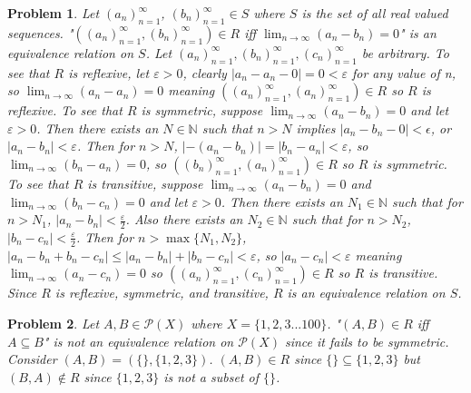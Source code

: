\documentclass{article}
\newtheorem{Problem}{Problem}
\begin{document}
\begin{Problem}
 Let $(a_n)_{n=1}^\infty$, $(b_n)_{n=1}^\infty\in S$ where $S$ is the set of all real valued sequences.  "$((a_n)_{n=1}^\infty,(b_n)_{n=1}^\infty) \in R$ iff $\lim_{n\to\infty}(a_n-b_n)=0$" is an equivalence relation on $S$.  Let $(a_n)_{n=1}^\infty,(b_n)_{n=1}^\infty,(c_n)_{n=1}^\infty$ be arbitrary.  To see that $R$ is reflexive, let $\varepsilon>0$, clearly $\lvert a_n-a_n-0\rvert=0<\varepsilon$ for any value of n, so $\lim_{n\to\infty}(a_n-a_n)=0$ meaning $((a_n)_{n=1}^\infty,(a_n)_{n=1}^\infty)\in R$ so $R$ is reflexive.  To see that $R$ is symmetric, suppose $\lim_{n\to\infty}(a_n-b_n)=0$ and let $\varepsilon>0$.  Then there exists an $N\in\mathbb{N}$ such that $n>N$ implies $\lvert a_n-b_n-0\rvert<\epsilon$, or $\lvert a_n-b_n\rvert<\varepsilon$.  Then for $n>N$, $\lvert -(a_n-b_n)\rvert=\lvert b_n-a_n\rvert<\varepsilon$, so $\lim_{n\to\infty}(b_n-a_n)=0$, so $((b_n)_{n=1}^\infty,(a_n)_{n=1}^\infty)\in R$ so $R$ is symmetric.  To see that $R$ is transitive, suppose $\lim_{n\to\infty}(a_n-b_n)=0$ and $\lim_{n\to\infty}(b_n-c_n)=0$ and let $\varepsilon>0$.  Then there exists an $N_1\in\mathbb{N}$ such that for $n>N_1$, $\lvert a_n-b_n\rvert<\frac{\varepsilon}{2}$.  Also there exists an $N_2\in\mathbb{N}$ such that for $n>N_2$, $\lvert b_n-c_n\rvert<\frac{\varepsilon}{2}$.  Then for $n>\max\{N_1,N_2\}$, $\lvert a_n-b_n+b_n-c_n\rvert\leq\lvert a_n-b_n\rvert+\lvert b_n-c_n\rvert<\varepsilon$, so $\lvert a_n-c_n\rvert<\varepsilon$ meaning $\lim_{n\to\infty}(a_n-c_n)=0$ so $((a_n)_{n=1}^\infty,(c_n)_{n=1}^\infty)\in R$ so $R$ is transitive.  Since $R$ is reflexive, symmetric, and transitive, $R$ is an equivalence relation on $S$.
\end{Problem}

\begin{Problem}
Let $A,B\in\mathcal{P}(X)$ where $X=\{1,2,3...100\}$.  "$(A,B)\in R$ iff $A\subseteq B$" is not an equivalence relation on $\mathcal{P}(X)$ since it fails to be symmetric.  Consider $(A,B)=(\{\},\{1,2,3\})$.  $(A,B)\in R$ since $\{\}\subseteq \{1,2,3\}$ but $(B,A)\notin R$ since $\{1,2,3\}$ is not a subset of $\{\}$.
\end{Problem}
\end{document}
